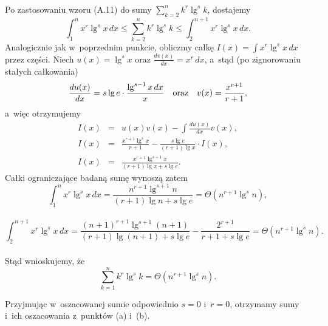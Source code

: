 \subsubsection{} %
Po zastosowaniu wzoru (A.11) do sumy $\sum_{k=2}^nk^r\lg^sk$, dostajemy
\[
	\int_1^nx^r\lg^sx\,dx \le \sum_{k=2}^nk^r\lg^sk \le \int_2^{n+1}x^r\lg^sx\,dx.
\]
Analogicznie jak w~poprzednim punkcie, obliczmy całkę $I(x) = \int x^r\lg^sx\,dx$ przez części. Niech $u(x)=\lg^sx$ oraz $\frac{dv(x)}{dx}=x^r\,dx$, a~stąd (po zignorowaniu stałych całkowania)
\[
	\frac{du(x)}{dx} = s\lg e\cdot\frac{\lg^{s-1}x\,dx}{x}\quad\hbox{oraz}\quad v(x)=\frac{x^{r+1}}{r+1},
\]
a~więc otrzymujemy
\begin{eqnarray*}
	I(x) &=& u(x)v(x)-\int\frac{du(x)}{dx}v(x), \\
	I(x) &=& \frac{x^{r+1}\lg^sx}{r+1}-\frac{s\lg e}{(r+1)\lg x}\cdot I(x), \\
	I(x) &=& \frac{x^{r+1}\lg^{s+1}x}{(r+1)\lg x+s\lg e}.
\end{eqnarray*}
Całki ograniczające badaną sumę wynoszą zatem
\[
	{\int_1^nx^r\lg^sx\,dx} = \frac{n^{r+1}\lg^{s+1}n}{(r+1)\lg n+s\lg e} = \Theta(n^{r+1}\lg^sn),
\]
\\
\[
	{\int_2^{n+1}x^r\lg^sx\,dx} = \frac{(n+1)^{r+1}\lg^{s+1}(n+1)}{(r+1)\lg(n+1)+s\lg e}-\dfrac{2^{r+1}}{r+1+s\lg e} = \Theta(n^{r+1}\lg^sn).
\]
\\
Stąd wnioskujemy, że
\[
	\sum_{k=1}^nk^r\lg^sk = \Theta(n^{r+1}\lg^sn).
\]

Przyjmując w~oszacowanej sumie odpowiednio $s=0$ i~$r=0$, otrzymamy sumy i~ich oszacowania z~punktów (a) i~(b).
